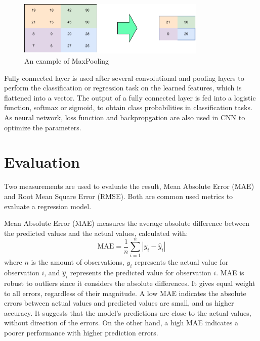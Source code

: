 \documentclass[12pt,a4paper,english
]{tunithesis}
\begin{document}
\begin{figure}
  \begin{center}
    \includegraphics[width=0.8\textwidth]{thesis/img/maxpooling.pdf}
  \end{center}
  \caption[MaxPooling]{An example of MaxPooling}
  \label{fig:maxpooling}
\end{figure}

Fully connected layer is used after several convolutional and pooling layers to perform the classification or regression task on the learned features, which is flattened into a vector. The output of a fully connected layer is fed into a logistic function, softmax or sigmoid, to obtain class probabilities in classification tasks. As neural network, loss function and backpropgation are also used in CNN to optimize the parameters.


\section{Evaluation}
Two measurements are used to evaluate the result, Mean Absolute Error (MAE) and Root Mean Square Error (RMSE). Both are common used metrics to evaluate a regression model.

Mean Absolute Error (MAE) measures the average absolute difference between the predicted values and the actual values, calculated with: 
\begin{equation*}
    \mathrm{MAE}=\frac{1}{n} \sum_{i=1}^n\left|y_i-\hat{y}_i\right|
\end{equation*}
where $n$ is the amount of observations, $y_i$ represents the actual value for observation $i$, and $\hat{y}_i$ represents the predicted value for observation $i$. MAE is robust to outliers since it considers the absolute differences. It gives equal weight to all errors, regardless of their magnitude. A low MAE indicates the absolute errors between actual values and predicted values are small, and as higher accuracy. It suggests that the model's predictions are close to the actual values, without direction of the errors. On the other hand, a high MAE indicates a poorer performance with higher prediction errors.
\end{document}

